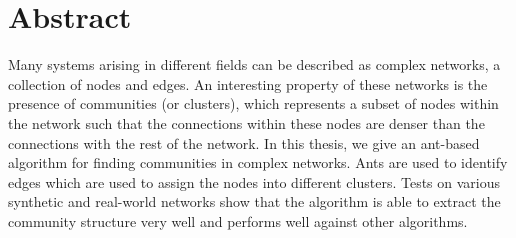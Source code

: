 \chapter*{Abstract}
\begin{spacing}{1.5}
Many systems arising in different fields can be described as complex networks, a collection of nodes and edges. An interesting property of these networks is the presence of communities (or clusters), which represents a subset of nodes within the network such that the connections within these nodes are denser than the connections with the rest of the network. In this thesis, we give an ant-based algorithm for finding communities in complex networks. Ants are used to identify edges which are used to assign the nodes into different clusters. Tests on various synthetic and real-world networks show that the algorithm is able to extract the community structure very well and performs well against other algorithms.
\end{spacing}
